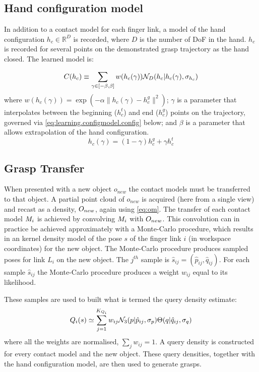 \subsection{Hand configuration model}
In addition to a contact model for each finger link, a model of the hand configuration $h_c \in \mathbb R^D$ is recorded, where $D$ is the number of DoF in the hand. $h_c$  is recorded for several points on the demonstrated grasp trajectory as the hand closed. The learned model is:

\begin{equation}
\hc(h_c) \equiv \sum_{\gamma \in [-\beta, \beta]} w({h_c(\gamma)}) \mathcal{N}_D(h_c|h_c(\gamma), \sigma_{h_c}) 
\label{eq:hc}
\end{equation}
where $w({h_c(\gamma)}) = \exp(-\alpha \|h_c(\gamma) - h^g_c \|^2)$; $\gamma$ is a parameter that interpolates between the beginning ($h^t_c$) and end ($h^g_c$) points on the trajectory, governed via \eq\ref{eq:learning.configmodel.config} below; and $\beta$ is a parameter that allows extrapolation of the hand configuration.
\begin{equation}
h_c(\gamma) = (1 - \gamma)h^g_c + \gamma h^t_c
\label{eq:learning.configmodel.config}
\end{equation}

\subsection{Grasp Transfer}
When presented with a new object $o_{new}$ the contact models must be transferred to that object.  A partial point cloud of $o_{new}$ is acquired (here from a single view) and recast as a density, $O_{new}$, again using \eq \ref{eq:om}. The transfer of each contact model $M_i$ is achieved by convolving $M_i$ with $O_{new}$. This convolution can in practice be achieved approximately with a Monte-Carlo procedure, which results in an kernel density model of the pose $s$ of the finger link $i$ (in workspace coordinates) for the new object. The Monte-Carlo procedure produces sampled poses for link $L_i$ on the new object. The $j^{th}$ sample is $\hat{s}_{ij}=(\hat{p}_{ij},\hat{q}_{ij})$. For each sample $\hat{s}_{ij}$ the Monte-Carlo procedure produces a weight $w_{ij}$ equal to its likelihood.

These samples are used to built what is termed the query density estimate:
\begin{equation}
\qd_i(s) \simeq \sum^{K_{Q_i}}_{j=1} w_{ij} \mathcal{N}_3(p|{\hat{p}_{ij}}, \sigma_{p}) \Theta(q|{\hat{q}_{ij}}, \sigma_{q})%
\label{eq:qd.approx}
\end{equation}
where all the weights are normalised, $\sum_j w_{ij} = 1$. A query density is constructed for every contact model and the new object. These query densities, together with the hand configuration model, are then used to generate grasps.

